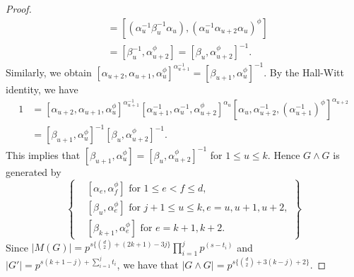 \documentclass[preprint,sort&compress,12pt]{elsarticle}
\numberwithin{equation}{section}
\theoremstyle{definition}
\begin{document}
\begin{proof}
\begin{align*}
    & = [(\alpha_u^{-1}\beta_u^{-1}\alpha_u),(\alpha_u^{-1}\alpha_{u+2}\alpha_u)^\phi]\\
    & = [\beta_u^{-1},\alpha_{u+2}^\phi]= [\beta_u,\alpha_{u+2}^\phi]^{-1}.
    \end{align*} 
Similarly, we obtain $[\alpha_{u+2},\alpha_{u+1},\alpha_u^{\phi}]^{\alpha_{u+1}^{-1}} = [\beta_{u+1},\alpha_u^\phi]^{-1}$.
By the Hall-Witt identity, we have
\begin{align*}
    1 & =[\alpha_{u+2},\alpha_{u+1},\alpha_u^{\phi}]^{\alpha_{u+1}^{-1}}[\alpha_{u+1}^{-1},\alpha_u^{-1},\alpha_{u+2}^\phi]^{\alpha_u}[\alpha_u,\alpha_{u+2}^{-1},(\alpha_{u+1}^{-1})^\phi]^{\alpha_{u+2}}\\
    & = [\beta_{u+1},\alpha_u^\phi]^{-1} [\beta_u,\alpha_{u+2}^\phi]^{-1}.
\end{align*}
This implies that $[\beta_{u+1},\alpha_u^\phi]=[\beta_u,\alpha_{u+2}^\phi]^{-1}$ for $1 \le u \le k$.
Hence $G \wedge G$ is generated by 
\begin{equation}\label{eq:generators of G wegde G}
\left\{
\begin{array}{cl}
    & [\alpha_e,\alpha_f^{\phi}] \text{ for }  1\le e <f \le d,\\
    & [\beta_u,\alpha_e^{\phi}]\text{ for } j+1\le u\le k, e=u,u+1,u+2,\\
    & [\beta_{k+1},\alpha_e^{\phi}] \text{ for } e=k+1,k+2.
\end{array}
\right\}
\end{equation}
Since $|M(G)| =p^{s\{\binom{d}{2}+(2k+1)-3j\}} \prod\limits_{i=1}^{j} p^{(s-t_i)}$ and $|G'|=p^{s(k+1-j)+\sum\limits_{i=1}^{j}t_i}$, we have that $|G \wedge G|=p^{s\{\binom{d}{2}+3(k-j)+2\}}$.


\end{proof}
\end{document}
